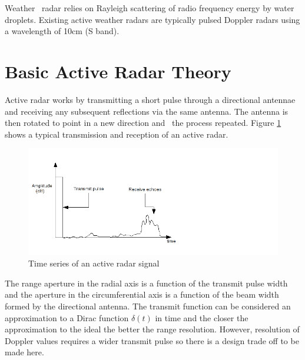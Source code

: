 \documentclass[a4paper]{report}
\numberwithin{equation}{chapter}
\begin{document}
\bigskip

Weather \ radar relies on Rayleigh scattering of radio frequency energy
by water droplets. Existing active weather radars are typically pulsed
Doppler radars using a wavelength of 10cm (S band).

\section{Basic Active Radar Theory}
Active radar works by transmitting a short pulse through a directional
antennae and receiving any subsequent reflections via the same antenna.
The antenna is then rotated to point in a new direction and \ the
process repeated. Figure \ref{fig:01} shows a typical transmission and reception of an active radar.

\begin{figure}
\centering 
\includegraphics{Passive-Weather-Radar-Theory-fig-01.png}
\caption[Time series of an active radar signal]{Time series of an active radar signal}
\label{fig:01}
\end{figure}

\bigskip

The range aperture in the radial axis is a function of the transmit pulse
width and the aperture in the circumferential axis is a function of the
beam width formed by the directional antenna. The transmit function can be considered an approximation to a Dirac function $\delta(t)$ in time and the closer the approximation to the ideal the better the range resolution. However, resolution of Doppler values requires a wider transmit pulse so there is a design trade off to be made here. 
\end{document}
